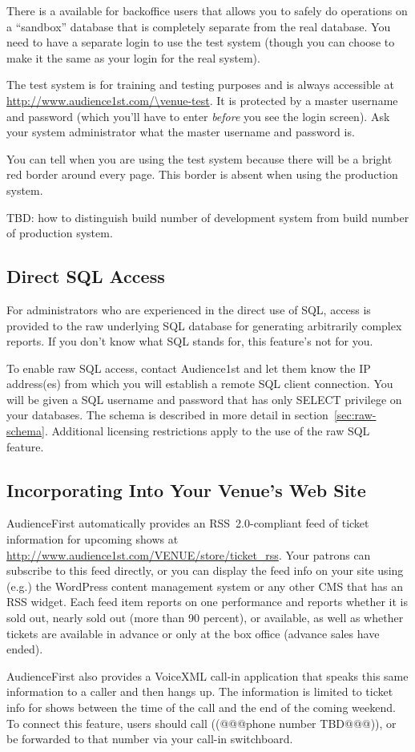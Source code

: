 There is a  available for backoffice users
that allows you to safely do operations on a ``sandbox'' database that
is completely separate from the real database.  You need to have a
separate login to use the test system (though you can choose to make it
the same as your login for the real system).

The test system is for
training and testing purposes and is always accessible at
\url{http://www.audience1st.com/\venue-test}. It is protected by a master
username and password (which you'll have to enter \emph{before} you see
the login screen).  Ask your system administrator what the master
username and password is.

You can tell when you are using the test system because there will be a
bright red border around every page. This border is absent when using
the production system.

TBD: how to distinguish build number of development system from build
number of production system.

\subsection{Direct SQL Access}
\label{sec:sql}

For administrators who are experienced in the direct use of SQL, access
is provided to the raw underlying SQL database for generating
arbitrarily complex reports.  If you don't know what SQL stands for,
this feature's not for you.

To enable raw SQL access, contact Audience1st and let them know the IP
address(es) from which you will establish a remote SQL client
connection.  You will be given a SQL username and password that has only
SELECT privilege on your databases.  The schema is described in more
detail in section~\ref{sec:raw-schema}.  Additional licensing
restrictions apply to the use of the raw SQL feature.

\subsection{Incorporating Into Your Venue's Web Site}
\label{sec:external}

AudienceFirst automatically provides an RSS~2.0-compliant feed of ticket
information for upcoming shows at
\url{http://www.audience1st.com/VENUE/store/ticket_rss}.  Your patrons
can subscribe to this feed directly, or you can display the feed info on
your site using (e.g.) the WordPress content management system or any
other CMS that has an RSS widget.  Each feed item reports on one
performance and reports whether it is sold out, nearly sold out (more
than 90 percent), or available, as well as whether tickets are available
in advance or only at the box office (advance sales have ended).

AudienceFirst also provides a VoiceXML call-in application that speaks
this same information to a caller and then hangs up.  The information is
limited to ticket info for shows between the time of the call and the
end of the coming weekend.  To connect this feature, users should call
((@@@phone number TBD@@@)), or be forwarded to that number via your
call-in switchboard.

